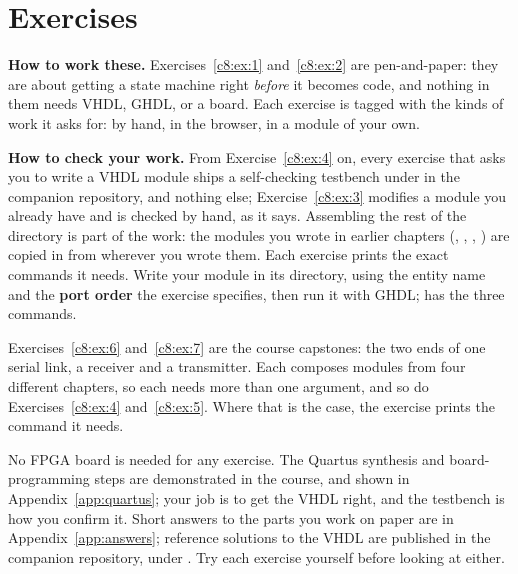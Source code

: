 
\section{Exercises}
\label{c8:sec:exercises}

\begin{aside}
\textbf{How to work these.} Exercises~\ref{c8:ex:1} and~\ref{c8:ex:2} are pen-and-paper: they are
about getting a state machine right \emph{before} it becomes code, and nothing in them needs VHDL,
GHDL, or a board. Each exercise is tagged with the kinds of work it asks for:  by hand,
 in the browser,  in a module of your own.

\textbf{How to check your work.} From Exercise~\ref{c8:ex:4} on, every exercise that asks you to
write a VHDL module ships a self-checking testbench under  in the
companion repository, and nothing else; Exercise~\ref{c8:ex:3} modifies a module you already have
and is checked by hand, as it says. Assembling the rest of the directory is part of the work: the
modules you wrote in earlier chapters (, , ,
) are copied in from wherever you wrote them. Each exercise prints the exact commands it
needs. Write your module in its  directory, using the entity name and the
\textbf{port order} the exercise specifies, then run it with GHDL;  has the three
commands.

Exercises~\ref{c8:ex:6} and~\ref{c8:ex:7} are the course capstones: the two ends of one serial
link, a receiver and a transmitter. Each composes modules from four different chapters, so each
needs more than one  argument, and so do Exercises~\ref{c8:ex:4} and~\ref{c8:ex:5}.
Where that is the case, the exercise prints the command it needs.

No FPGA board is needed for any exercise. The Quartus synthesis and board-programming steps are
demonstrated in the course, and shown in Appendix~\ref{app:quartus}; your job is to get the VHDL
right, and the testbench is how you confirm it. Short answers to the parts you work on paper are in
Appendix~\ref{app:answers}; reference solutions to the VHDL are published in the companion
repository, under . Try each exercise yourself before looking at
either.
\end{aside}

